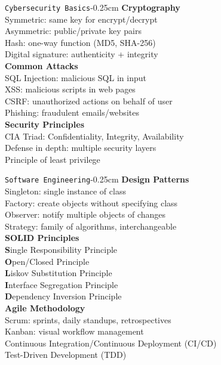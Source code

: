 \documentclass[10pt,3col]{cheatsheet}
\begin{document}
\begin{multicols}{3}
\begin{cheatsheetbox}{\texttt{Cybersecurity Basics}}{-0.25cm}
    \textbf{Cryptography}\\
    Symmetric: same key for encrypt/decrypt\\
    Asymmetric: public/private key pairs\\
    Hash: one-way function (MD5, SHA-256)\\
    Digital signature: authenticity + integrity\\
    \textbf{Common Attacks}\\
    SQL Injection: malicious SQL in input\\
    XSS: malicious scripts in web pages\\
    CSRF: unauthorized actions on behalf of user\\
    Phishing: fraudulent emails/websites\\
    \textbf{Security Principles}\\
    CIA Triad: Confidentiality, Integrity, Availability\\
    Defense in depth: multiple security layers\\
    Principle of least privilege
\end{cheatsheetbox}

\begin{cheatsheetbox}{\texttt{Software Engineering}}{-0.25cm}
    \textbf{Design Patterns}\\
    Singleton: single instance of class\\
    Factory: create objects without specifying class\\
    Observer: notify multiple objects of changes\\
    Strategy: family of algorithms, interchangeable\\
    \textbf{SOLID Principles}\\
    \textbf{S}ingle Responsibility Principle\\
    \textbf{O}pen/Closed Principle\\
    \textbf{L}iskov Substitution Principle\\
    \textbf{I}nterface Segregation Principle\\
    \textbf{D}ependency Inversion Principle\\
    \textbf{Agile Methodology}\\
    Scrum: sprints, daily standups, retrospectives\\
    Kanban: visual workflow management\\
    Continuous Integration/Continuous Deployment (CI/CD)\\
    Test-Driven Development (TDD)
\end{cheatsheetbox}

\makefooter

\end{multicols}
\end{document}
